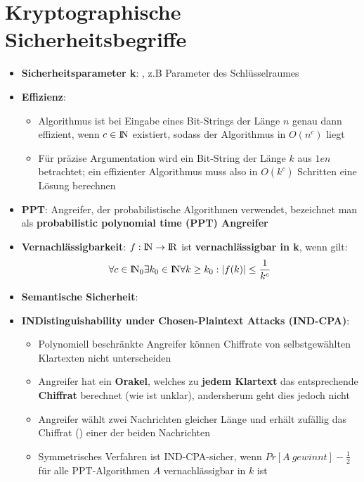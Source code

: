 \section{Kryptographische Sicherheitsbegriffe}%
\label{kseb:sec:kryptographische_sicherheitsbegriffe}

\begin{itemize}
	\item \textbf{Sicherheitsparameter k}: , z.B Parameter des Schlüsselraumes
	\item \textbf{Effizienz}:
	\begin{itemize}
		\item Algorithmus ist bei Eingabe eines Bit-Strings der Länge $n$ genau dann effizient, wenn $c \in {\rm I\!N}$ existiert, sodass der Algorithmus in $O(n^c)$ liegt
		\item Für präzise Argumentation wird ein Bit-String der Länge $k$ aus $1en$ betrachtet; ein effizienter Algorithmus muss also in $O(k^c)$ Schritten eine Lösung berechnen
	\end{itemize}
	\item \textbf{PPT}: Angreifer, der probabilistische Algorithmen verwendet, bezeichnet man als \textbf{probabilistic polynomial time (PPT) Angreifer}
	\item \textbf{Vernachlässigbarkeit}: $f: {\rm I\!N} \rightarrow {\rm I\!R}$ ist \textbf{vernachlässigbar in k}, wenn gilt:
	$$
		\forall c \in {\rm I\!N}_0 \exists k_0 \in {\rm I\!N} \forall k \geq k_0: |f(k)| \leq \frac{1}{k^c}
	$$
	\item \textbf{Semantische Sicherheit}: 
	\item \textbf{INDistinguishability under Chosen-Plaintext Attacks (IND-CPA)}:
	\begin{itemize}
		\item Polynomiell beschränkte Angreifer können Chiffrate von selbstgewählten Klartexten nicht unterscheiden
		\item Angreifer hat ein \textbf{Orakel}, welches zu \textbf{jedem Klartext} das entsprechende \textbf{Chiffrat} berechnet (wie ist unklar), andersherum geht dies jedoch nicht
		\item Angreifer wählt zwei Nachrichten gleicher Länge und erhält zufällig das Chiffrat () einer der beiden Nachrichten
		\item Symmetrisches Verfahren ist IND-CPA-sicher, wenn $Pr[A\ gewinnt] - \frac{1}{2}$ für alle PPT-Algorithmen $A$ vernachlässigbar in $k$ ist

\end{itemize}
\end{itemize}

